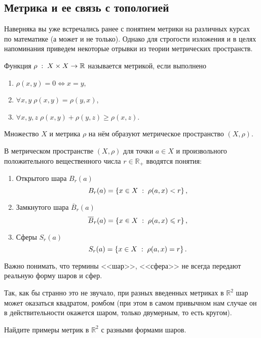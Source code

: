    \subsection{Метрика и ее связь с топологией}
   Наверняка вы уже встречались ранее с понятием метрики на различных курсах по математике (а может и не только). Однако для строгости изложения и в целях напоминания приведем некоторые отрывки из теории метрических пространств.
   \begin{Def}
       [Метрика]
       Функция $\rho\; : \; X \times X \to \mathbb{R}$ называется метрикой, если выполнено
       \begin{enumerate}
           \item $\rho(x,y) = 0 \Leftrightarrow x = y$,
           \item $\forall x,y \; \rho(x,y) = \rho(y,x)$,
           \item $\forall x,y,z \; \rho(x,y) + \rho(y,z) \geqslant \rho(x,z)$.
       \end{enumerate}
   \end{Def}
   \begin{Def}
       Множество $X$ и метрика $\rho$ на нём образуют метрическое пространство $(X, \rho)$.
   \end{Def}

   \begin{Def}
       В метрическом пространстве $(X, \rho)$ для точки $a\in X$ и произвольного положительного вещественного числа $r\in \mathbb{R}_+$ вводятся понятия:
       \begin{enumerate}
           \item Открытого шара $B_r(a)$
               \[
                   B_r(a) = \left\{ x\in X \; : \; \rho(a, x) < r \right\},
               \] 
           \item Замкнутого шара $\overline{B}_r(a)$ 
               \[
                   \overline{B}_r(a) = \left\{ x\in X \; : \; \rho(a, x) \leqslant r \right \},
               \] 
           \item Сферы $S_r(a)$ 
               \[
                   S_r(a) = \left \{ x \in X \; : \; \rho (a, x) = r \right \}.
               \] 
       \end{enumerate}
   \end{Def}

   \begin{Note}
       Важно понимать, что термины <<шар>>, <<сфера>> не всегда передают реальную форму шаров и сфер. 

       Так, как бы странно это не звучало, при разных введенных метриках в $\mathbb{R}^2$ шар может оказаться квадратом, ромбом (при этом в самом привычном нам случае он в действительности окажется шаром, только двумерным, то есть кругом).
   \end{Note}
   \begin{Task}
       Найдите примеры метрик в $\mathbb{R}^2$ с разными формами шаров. 
   \end{Task}

